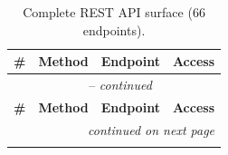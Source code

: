 \begingroup
\footnotesize
\begin{longtable}{@{}r l >{\ttfamily\raggedright\arraybackslash\let\texttt\apiep}p{6.4cm} l@{}}
	\caption{Complete REST API surface (66 endpoints).}
	\label{tab:api-reference} \\
	\toprule
	\textbf{\#} & \textbf{Method} & \textbf{Endpoint} & \textbf{Access} \\
	\midrule
	\endfirsthead
	\multicolumn{4}{c}{\tablename\ \thetable\ -- \textit{continued}} \\
	\toprule
	\textbf{\#} & \textbf{Method} & \textbf{Endpoint} & \textbf{Access} \\
	\midrule
	\endhead
	\midrule \multicolumn{4}{r}{\textit{continued on next page}} \\
	\endfoot
	\bottomrule
	\endlastfoot


\end{longtable}

